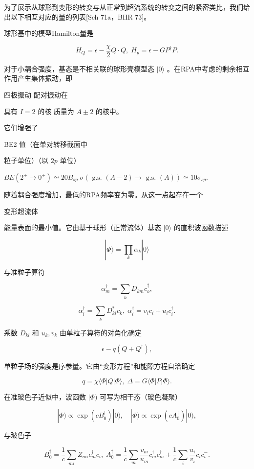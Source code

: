 为了展示从球形到变形的转变与从正常到超流系统的转变之间的紧密类比，我们给出以下相互对应的量的列表{[}Sch 71a，BHR 73{]}。

球形基中的模型Hamilton量是

\[
{H}_{Q}=\epsilon-\frac{\chi}{2}Q\cdot Q,\;{H}_{p}=\epsilon-GP^{\dagger}P.
\]

对于小耦合强度，基态是不相关联的球形壳模型态 $|0\rangle$ 。在RPA中考虑的剩余相互作用产生集体振动，即

四极振动 配对振动在

具有 $I=2$ 的核 质量为 $A\pm2$ 的核中。

它们增强了

BE2 值（在单对转移截面中

粒子单位）（以 ${2p}$ 单位）

${BE}\left({{2}^{+}\rightarrow{0}^{+}}\right)\simeq{20}{B}_{sp}\;\sigma\left({\text{ g.s. }\left({A-2}\right)\rightarrow\text{ g.s. }\left(A\right)}\right)\simeq{10}{\sigma}_{sp}.$

随着耦合强度增加，最低的RPA频率变为零。从这一点起存在一个

变形超流体

能量表面的最小值。它由基于球形（正常流体）基态 $|0\rangle$ 的直积波函数描述

\[
|\Phi\rangle=\mathop{\prod}\limits_{k}{\alpha}_{k}|0\rangle
\]

与准粒子算符

\[
\alpha^{\dagger}_{m}=\mathop{\sum}\limits_{k}{D}_{km}c^{\dagger}_{k},
\]

\[
\alpha^{\dagger}_{i}=\mathop{\sum}\limits_{k}{D}^{*}_{ki}{c}_{k},\;\alpha^{\dagger}_{i}={v}_{i}{c}_{i}+{u}_{i}c^{\dagger}_{i}.
\]

系数 ${D}_{kl}$ 和 ${u}_{k},{v}_{k}$ 由单粒子算符的对角化确定

\[
\epsilon-q\left({Q+Q^{\dagger}}\right),
\]

单粒子场的强度是序参量。它由“变形方程”和能隙方程自洽确定

\[
q=\chi\langle\Phi\left|Q\right|\Phi\rangle,\;\Delta=G\langle\Phi\left|P\right|\Phi\rangle.
\]

在准玻色子近似中，波函数 $|\Phi)$ 可写为相干态（玻色凝聚）

\[
|\Phi)\propto\exp(cB^{\dagger}_{0})|0),\quad|\Phi)\propto\exp(cA^{\dagger}_{0})|0),
\]

与玻色子

\[
B^{\dagger}_{0}=\frac{1}{c}\mathop{\sum}\limits_{{mi}}{Z}_{mi}c^{\dagger}_{m}{c}_{i},\;A^{\dagger}_{0}=\frac{1}{c}\mathop{\sum}\limits_{m}\frac{{v}_{m}}{{u}_{m}}c^{\dagger}_{m}c^{\dagger}_{m}+\frac{1}{c}\mathop{\sum}\limits_{i}\frac{{u}_{i}}{{v}_{i}}{c}_{i}{c}^{-}_{i}.
\]


